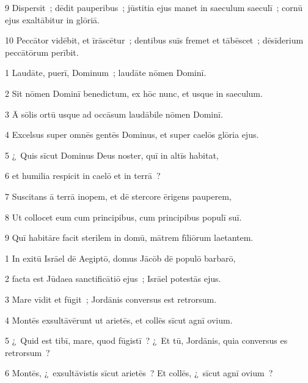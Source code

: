 \psalmVerse
  {\phantom{00}9}
  {Dispersit~; dēdit pauperibus~; jūstitia ejus manet in saeculum saeculī~; cornū ejus exaltābitur in glōriā.}


\psalmVerse
  {\phantom{0}10}
  {Peccātor vidēbit, et īrāscētur~; dentibus suīs fremet et tābēscet~; dēsīderium peccātōrum perībit.}




\psalmVerse
  {\phantom{00}1}
  {Laudāte, puerī, Dominum~; laudāte nōmen Dominī.}


\psalmVerse
  {\phantom{00}2}
  {Sit nōmen Dominī benedictum, ex hōc nunc, et usque in saeculum.}


\psalmVerse
  {\phantom{00}3}
  {Ā sōlis ortū usque ad occāsum laudābile nōmen Dominī.}


\psalmVerse
  {\phantom{00}4}
  {Excelsus super omnēs gentēs Dominus, et super caelōs glōria ejus.}


\psalmVerse
  {\phantom{00}5}
  {¿~Quis sīcut Dominus Deus noster, quī in altīs habitat,}


\psalmVerse
  {\phantom{00}6}
  {et humilia respicit in caelō et in terrā~?}


\psalmVerse
  {\phantom{00}7}
  {Suscitans ā terrā inopem, et dē stercore ērigens pauperem,}


\psalmVerse
  {\phantom{00}8}
  {Ut collocet eum cum principibus, cum principibus populī suī.}


\psalmVerse
  {\phantom{00}9}
  {Quī habitāre facit sterilem in domū, mātrem fīliōrum laetantem.}



\psalmVerse
  {\phantom{00}1}
  {In exitū Isrāel dē Aegiptō, domus Jācōb dē populō barbarō,}


\psalmVerse
  {\phantom{00}2}
  {facta est Jūdaea sanctificātiō ejus~; Isrāel potestās ejus.}


\psalmVerse
  {\phantom{00}3}
  {Mare vīdit et fūgit~; Jordānis conversus est retrorsum.}


\psalmVerse
  {\phantom{00}4}
  {Montēs exsultāvērunt ut arietēs, et collēs sīcut agnī ovium.}


\psalmVerse
  {\phantom{00}5}
  {¿~Quid est tibī, mare, quod fūgistī~? ¿~Et tū, Jordānis, quia conversus es retrorsum~?}


\psalmVerse
  {\phantom{00}6}
  {Montēs, ¿~exsultāvistis sīcut arietēs~? Et collēs, ¿~sīcut agnī ovium~?}


